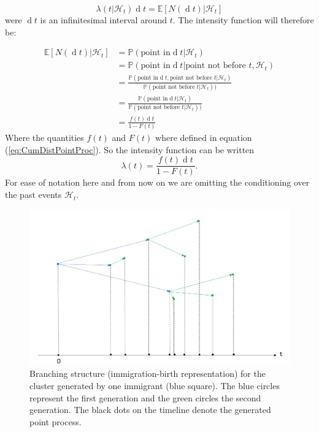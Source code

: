 \documentclass[11pt,a4paper]{article}
\renewcommand{\d}[1]{\ensuremath{\operatorname{d}\!{#1}}}
\begin{document}
\begin{equation*}
    \lambda(t | \mathcal{H}_t) \d t = \mathbb{E}[N(\d t) | \mathcal{H}_t]
\end{equation*}
were $\d t$ is an infinitesimal interval around $t$.
The intensity function will therefore be:

\begin{align*}
    \mathbb{E}[N(\d t) | \mathcal{H}_t] &= \mathbb{P}(\textrm{point in} \d t | \mathcal{H}_t) \\
    & = \mathbb{P}(\textrm{point in} \d t | \textrm{point not before } t, \mathcal{H}_t) \\
    & = \frac{\mathbb{P}(\textrm{point in} \d t, \textrm{point not before } t | \mathcal{H}_t)}{\mathbb{P}(\textrm{point not before } t | \mathcal{H}_t))} \\
    & = \frac{\mathbb{P}(\textrm{point in} \d t | \mathcal{H}_t)}{\mathbb{P}(\textrm{point not before } t | \mathcal{H}_t))} \\
    & = \frac{f(t) \d t}{1 - F(t)}
\end{align*}
Where the quantities $f(t)$ and $F(t)$ where defined in equation (\ref{eq:CumDistPointProc}). So the intensity function can be written
\begin{equation}\label{eq:IntFun}
    \lambda(t) = \frac{f(t) \d t}{1 - F(t)}.
\end{equation}
For ease of notation here and from now on we are omitting the conditioning over the past events $\mathcal{H}_t$.


\begin{figure}
\centering
    \includegraphics[width=0.8\linewidth]{Hawkes.PNG}
\caption{Branching structure (immigration-birth representation) for the cluster generated by one immigrant (blue square). The blue circles represent the first generation and the green circles the second generation. The black dots on the timeline denote the generated point process.}
\label{fig:Hawkes}
\end{figure}
\end{document}
